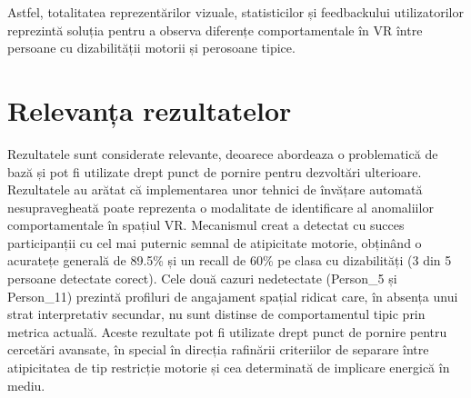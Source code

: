 \documentclass[12pt,a4paper]{report}
\theoremstyle{definition}
\theoremstyle{remark}
\begin{document}
Astfel, totalitatea reprezentărilor vizuale, statisticilor și feedbackului utilizatorilor reprezintă soluția pentru a observa diferențe comportamentale în VR între persoane cu dizabilității motorii și perosoane tipice.

\section{Relevanța rezultatelor}
Rezultatele sunt considerate relevante, deoarece abordeaza o problematică de bază și pot fi utilizate drept punct de pornire pentru dezvoltări ulterioare. 
Rezultatele au arătat că implementarea unor tehnici de învățare automată nesupravegheată poate reprezenta o modalitate de identificare al anomaliilor comportamentale în spațiul VR. Mecanismul creat a detectat cu succes participanții cu cel mai puternic semnal de atipicitate motorie, obținând o acuratețe generală de 89.5\% și un recall de 60\% pe clasa cu dizabilități (3 din 5 persoane detectate corect). Cele două cazuri nedetectate (Person\_5 și Person\_11) prezintă profiluri de angajament spațial ridicat care, în absența unui strat interpretativ secundar, nu sunt distinse de comportamentul tipic prin metrica actuală. Aceste rezultate pot fi utilizate drept punct de pornire pentru cercetări avansate, în special în direcția rafinării criteriilor de separare între atipicitatea de tip restricție motorie și cea determinată de implicare energică în mediu.

\end{document}

